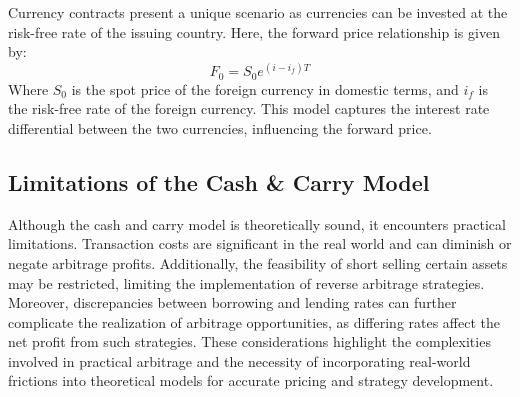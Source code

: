\documentclass[a4paper,10pt]{article}
\begin{document}
            \noindent Currency contracts present a unique scenario as currencies can be invested at the risk-free rate of the issuing country. Here, the forward price relationship is given by: \[F_0 = S_0 e^{(i-i_f)T}\] Where \(S_0\) is the spot price of the foreign currency in domestic terms, and \(i_f\) is the risk-free rate of the foreign currency. This model captures the interest rate differential between the two currencies, influencing the forward price. \\
        
    \subsection*{Limitations of the Cash \& Carry Model}
    
        \noindent Although the cash and carry model is theoretically sound, it encounters practical limitations. Transaction costs are significant in the real world and can diminish or negate arbitrage profits. Additionally, the feasibility of short selling certain assets may be restricted, limiting the implementation of reverse arbitrage strategies. Moreover, discrepancies between borrowing and lending rates can further complicate the realization of arbitrage opportunities, as differing rates affect the net profit from such strategies. These considerations highlight the complexities involved in practical arbitrage and the necessity of incorporating real-world frictions into theoretical models for accurate pricing and strategy development. \\
        
\end{document}
